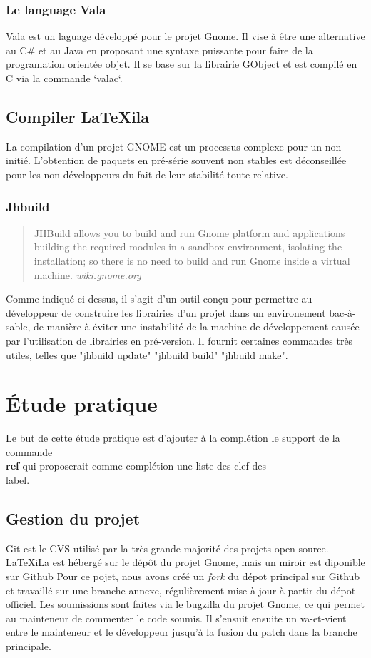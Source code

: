 \documentclass[a4paper,11pt]{report}
\begin{document}
\subsection{Le language Vala}
\label{sss:vala}
Vala est un laguage développé pour le projet Gnome. Il vise à être une alternative au C\# et au Java en proposant une syntaxe puissante pour faire de la programation orientée objet. Il se base sur la librairie GObject et est compilé en C via la commande `valac`.

\section{Compiler LaTeXila}
\label{cha:compiler}
La compilation d'un projet GNOME est un processus complexe pour un non-initié. L'obtention de paquets en pré-série souvent non stables est déconseillée pour les non-développeurs du fait de leur stabilité toute relative.

\subsection{Jhbuild}
\label{sub:jhbuild}
\begin{quote}
  JHBuild allows you to build and run Gnome platform and applications building the required modules in a sandbox environment, isolating the installation; so there is no need to build and run Gnome inside a virtual machine. \textit{wiki.gnome.org}
\end{quote}
Comme indiqué ci-dessus, il s'agit d'un outil conçu pour permettre au développeur de construire les librairies d'un projet dans un environement bac-à-sable, de manière à éviter une instabilité de la machine de développement causée par l'utilisation de librairies en pré-version. Il fournit certaines commandes très utiles, telles que "jhbuild update" "jhbuild build" "jhbuild make".

\chapter{Étude pratique} %
\label{cha:etude_pratique}
Le but de cette étude pratique est d'ajouter à la complétion le support de la commande \textbf{\\ref} qui proposerait comme complétion une liste des clef des \\label. 

\section{Gestion du projet} %
\label{sec:git}
Git est le CVS utilisé par la très grande majorité des projets open-source. LaTeXiLa est hébergé sur le dépôt du projet Gnome, mais un miroir est diponible sur Github %
Pour ce pojet, nous avons créé un \textit{fork} du dépot principal sur Github et travaillé sur une branche annexe, régulièrement mise à jour à partir du dépot officiel.
Les soumissions sont faites via le bugzilla du projet Gnome, ce qui permet au mainteneur de commenter le code soumis. Il s'ensuit ensuite un va-et-vient entre le mainteneur et le développeur jusqu'à la fusion du patch dans la branche principale.
\end{document}

